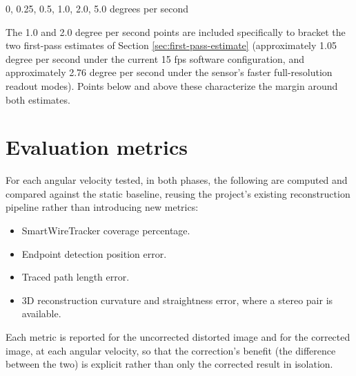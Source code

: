 \begin{center}
0, 0.25, 0.5, 1.0, 2.0, 5.0 degrees per second
\end{center}

The 1.0 and 2.0 degree per second points are included specifically to bracket the two first-pass estimates of Section \ref{sec:first-pass-estimate} (approximately 1.05 degree per second under the current 15 fps software configuration, and approximately 2.76 degree per second under the sensor's faster full-resolution readout modes). Points below and above these characterize the margin around both estimates.

\section{Evaluation metrics}

For each angular velocity tested, in both phases, the following are computed and compared against the static baseline, reusing the project's existing reconstruction pipeline rather than introducing new metrics:

\begin{itemize}
    \item SmartWireTracker coverage percentage.
    \item Endpoint detection position error.
    \item Traced path length error.
    \item 3D reconstruction curvature and straightness error, where a stereo pair is available.
\end{itemize}

Each metric is reported for the uncorrected distorted image and for the corrected image, at each angular velocity, so that the correction's benefit (the difference between the two) is explicit rather than only the corrected result in isolation.
